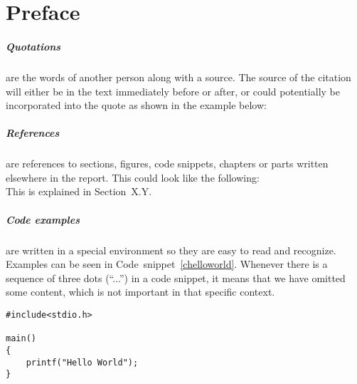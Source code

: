\chapter*{Preface}
\label{preface}


\paragraph{Quotations} are the words of another person along with a source.
The source of the citation will either be in the text immediately before or after, or could potentially be incorporated into the quote as shown in the example below: \\


\paragraph{References} are references to sections, figures, code snippets, chapters or parts written elsewhere in the report. 
This could look like the following:\\

This is explained in Section~X.Y.

\paragraph{Code examples} are written in a special environment so they are easy to read and recognize. 
Examples can be seen in Code~snippet~\ref{chelloworld}. 
Whenever there is a sequence of three dots (``...'') in a code snippet, it means that we have omitted some content, which is not important in that specific context.

\begin{lstlisting}[style=sourceC, caption={Code example of a hello world program written in C.}, label=chelloworld]
#include<stdio.h>

main()
{
    printf("Hello World");
}
\end{lstlisting}